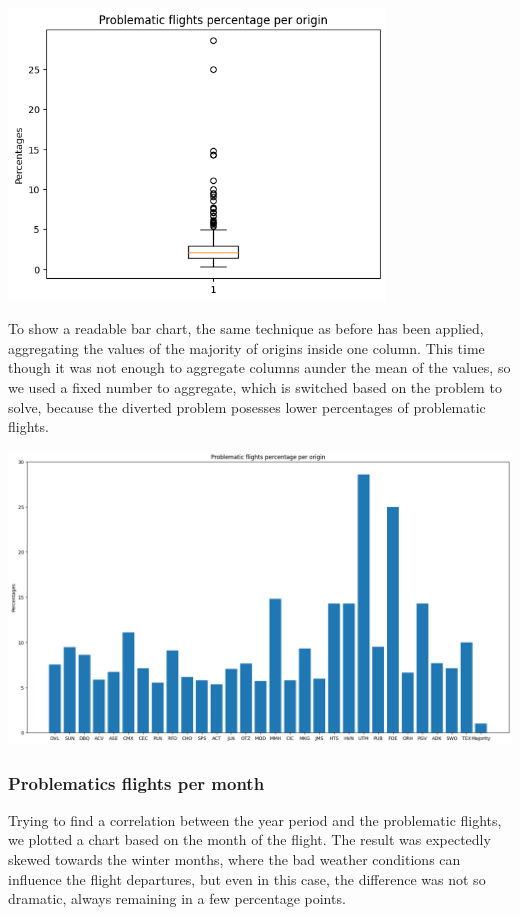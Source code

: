 \documentclass[
	letterpaper, %
	10pt, %
]{class}
\begin{document}
\begin{center}
    \includegraphics[width=10cm]{../images/problematics_box_per_origin.png}
\end{center}

To show a readable bar chart, the same technique as before has been applied, aggregating the values of the majority of origins inside one column. This time though it was not enough to aggregate columns aunder the mean of the values, so we used a fixed number to aggregate, which is switched based on the problem to solve,
because the diverted problem posesses lower percentages of problematic flights.

\begin{center}
    \includegraphics[width=14cm]{../images/problematics_per_origin.png}
\end{center}
\newpage

\subsubsection{Problematics flights per month}
Trying to find a correlation between the year period and the problematic flights, we plotted a chart based on the month of the flight. The result was expectedly skewed towards the winter months, where the bad weather conditions can influence the flight departures, but even in this case, the difference was not so dramatic, always remaining in a few percentage points.
\end{document}
